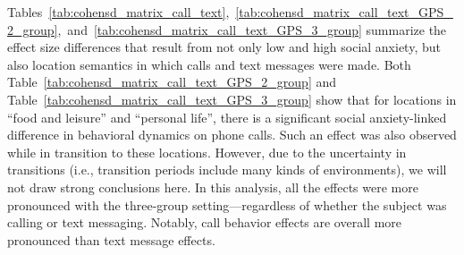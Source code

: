 Tables~\ref{tab:cohensd_matrix_call_text},~\ref{tab:cohensd_matrix_call_text_GPS_2_group},~and~\ref{tab:cohensd_matrix_call_text_GPS_3_group} summarize the effect size differences that result from not only low and high social anxiety, but also location semantics in which calls and text messages were made. Both Table~\ref{tab:cohensd_matrix_call_text_GPS_2_group} and Table~\ref{tab:cohensd_matrix_call_text_GPS_3_group} show that for locations in ``food and leisure'' and ``personal life'', there is a significant social anxiety-linked difference in behavioral dynamics on phone calls. Such an effect was also observed while in transition to these locations. 
However, due to the uncertainty in transitions (i.e., transition periods include many kinds of environments), we will not draw strong conclusions here. 
In this analysis, all the effects were more pronounced with the three-group setting---regardless of whether the subject was calling or text messaging. Notably, call behavior effects are overall more pronounced than text message effects.  



